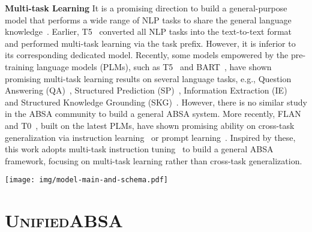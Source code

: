 \documentclass[11pt]{article}
\newcommand{\UnifiedABSA}{\textsc{UnifiedABSA}\xspace}
\newcommand{\USI}{\textsc{USI}\xspace}
\begin{document}
\noindent\textbf{Multi-task Learning} \quad It is a promising direction to build a general-purpose model that performs a wide range of NLP tasks to share the general language knowledge~\citep{DBLP:journals/ml/Caruana97,DBLP:conf/icml/CollobertW08,DBLP:journals/corr/abs-1806-08730-decathlon}. Earlier, T5~\citep{raffel2020t5} converted all NLP tasks into the text-to-text format and performed multi-task learning via the task prefix. However, it is inferior to its corresponding dedicated model. Recently, some models empowered by the pre-training language models (PLMs), such as T5~\citep{raffel2020t5} and BART~\citep{lewis-etal-2020-bart}, have shown promising multi-task learning results on several language tasks, e.g., Question Answering (QA)~\citep{khashabi-etal-2020-unifiedqa,zhong-etal-2022-proqa}, Structured Prediction (SP)~\citep{DBLP:conf/iclr/Paolini21tanl}, Information Extraction (IE)~\citep{lu-etal-2022-uie} and Structured Knowledge Grounding (SKG)~\citep{DBLP:journals/corr/abs-2201-05966-unifiedskg}. However, there is no similar study in the ABSA community to build a general ABSA system. More recently, FLAN~\citep{wei2021flan} and T0~\citep{sanh2021t0}, built on the latest PLMs, have shown promising ability on cross-task generalization via instruction learning~\citep{mishra-etal-2022-natural-instruction} or prompt learning~\citep{liu2021prompt-survey}. Inspired by these, this work adopts multi-task instruction tuning~\citep{wei2021flan} to build a general ABSA framework, focusing on multi-task learning rather than cross-task generalization.



\begin{figure*}[!h]
\centering 
\texttt{[image: img/model-main-and-schema.pdf]} 
\caption{Left: An overview of \USI wrapped input and output. The input consists of the original review sentence, task name, sentiment options, category options, and template, where sentiment options and category options are optional and not required for some tasks (e.g., AOPE). Right: The overview framework of \UnifiedABSA. A few task instances are shown here.} 
\vspace{-3mm}
\label{fig:Unified-Model}
\end{figure*}

\section{\UnifiedABSA}
\end{document}
